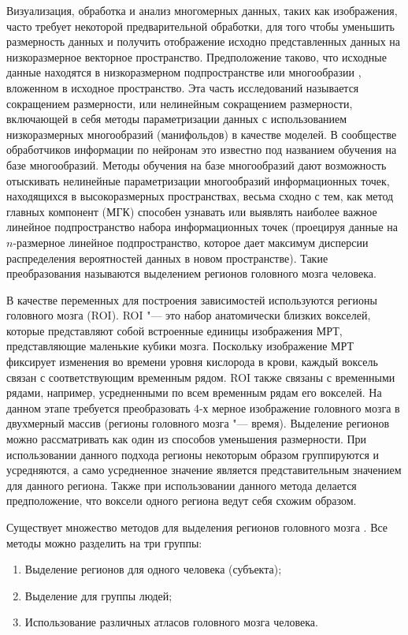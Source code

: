 Визуализация, обработка и анализ многомерных данных, таких как изображения, часто требует некоторой предварительной 
обработки, для того чтобы уменьшить размерность данных и получить отображение исходно представленных данных на 
низкоразмерное векторное пространство. Предположение таково, что исходные данные находятся в низкоразмерном 
подпространстве или многообразии \cite{brun2006manifold}, вложенном в исходное пространство. Эта часть исследований 
называется сокращением размерности, или нелинейным сокращением размерности, включающей в себя методы параметризации 
данных с использованием низкоразмерных многообразий (манифольдов) в качестве моделей. В сообществе обработчиков 
информации по нейронам это известно под названием обучения на базе многообразий. Методы обучения на базе многообразий 
дают возможность отыскивать нелинейные параметризации многообразий информационных точек, находящихся в высокоразмерных 
пространствах, весьма сходно с тем, как метод главных компонент (МГК) способен узнавать или выявлять наиболее важное 
линейное подпространство набора информационных точек (проецируя данные на $n$-размерное линейное подпространство, 
которое дает максимум дисперсии распределения вероятностей данных в новом пространстве). Такие преобразования 
называются выделением регионов головного мозга человека.

В качестве переменных для построения зависимостей используются регионы головного мозга (ROI). ROI "--- это набор 
анатомически близких вокселей, которые представляют собой встроенные единицы изображения МРТ, представляющие маленькие 
кубики мозга. Поскольку изображение МРТ фиксирует изменения во времени уровня кислорода в крови, каждый воксель связан 
с соответствующим временным рядом. ROI также связаны с временными рядами, например, усредненными по всем временным 
рядам его вокселей. На данном этапе требуется преобразовать 4-х мерное изображение головного мозга в двухмерный массив 
(регионы головного мозга "--- время). Выделение регионов можно рассматривать как один из способов уменьшения размерности. 
При использовании данного подхода регионы некоторым образом группируются и усредняются, а само усредненное значение 
является представительным значением для данного региона. Также при использовании данного метода делается предположение, 
что воксели одного региона ведут себя схожим образом. 

Существует множество методов для выделения регионов головного мозга \cite{Arslan2018}. Все методы можно разделить 
на три группы:
\begin{enumerate}
    \item Выделение регионов для одного человека (субъекта);
    \item Выделение для группы людей;
    \item Использование различных атласов головного мозга человека.
\end{enumerate}

